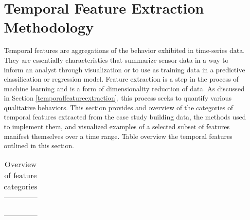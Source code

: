 \section{Temporal Feature Extraction Methodology}
\label{sec:featureextraction}

Temporal features are aggregations of the behavior exhibited in time-series data. They are essentially characteristics that summarize sensor data in a way to inform an analyst through visualization or to use as training data in a predictive classification or regression model. Feature extraction is a step in the process of machine learning and is a form of dimensionality reduction of data. As discussed in Section \ref{temporalfeatureextraction}, this process seeks to quantify various qualitative behaviors. This section provides and overview of the categories of temporal features extracted from the case study building data, the methods used to implement them, and visualized examples of a selected subset of features manifest themselves over a time range. Table  overview the temporal features outlined in this section.

\begin{table} 
    \begin{tabular}{ c c }
         &  \\ 
         &  \\ 
         &  \\ 
         &  \\ 
         &  \\ 
         &  \\ 
    \end{tabular} 
    \caption{Overview of feature categories}
    \label{tab:featureoverview}
\end{table}

